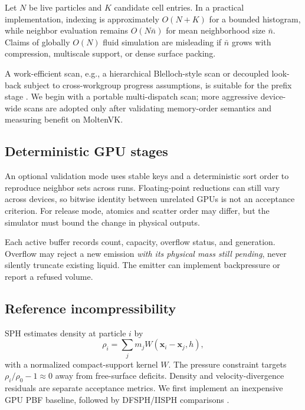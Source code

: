 \documentclass[10pt,a4paper]{article}
\makeatletter
\renewcommand{\section}{\@startsection{section}{1}{\z@}{1.35ex plus .5ex minus .1ex}{.7ex}{\normalfont\bfseries\normalsize}}
\makeatother
\begin{document}
Let $N$ be live particles and $K$ candidate cell entries. In a practical implementation, indexing is approximately $O(N+K)$ for a bounded histogram, while neighbor evaluation remains $O(N\bar n)$ for mean neighborhood size $\bar n$. Claims of globally $O(N)$ fluid simulation are misleading if $\bar n$ grows with compression, multiscale support, or dense surface packing.

A work-efficient scan, e.g., a hierarchical Blelloch-style scan or decoupled look-back subject to cross-workgroup progress assumptions, is suitable for the prefix stage \citep{merrill2016}. We begin with a portable multi-dispatch scan; more aggressive device-wide scans are adopted only after validating memory-order semantics and measuring benefit on MoltenVK.

\subsection{Deterministic GPU stages}
An optional validation mode uses stable keys and a deterministic sort order to reproduce neighbor sets across runs. Floating-point reductions can still vary across devices, so bitwise identity between unrelated GPUs is not an acceptance criterion. For release mode, atomics and scatter order may differ, but the simulator must bound the change in physical outputs.

Each active buffer records count, capacity, overflow status, and generation. Overflow may reject a new emission \emph{with its physical mass still pending}, never silently truncate existing liquid. The emitter can implement backpressure or report a refused volume.

\section{Numerical Solver}
\subsection{Reference incompressibility}
SPH estimates density at particle $i$ by
\begin{equation}
\rho_i=\sum_j m_j W(\mathbf x_i-\mathbf x_j,h),
\label{eq:density}
\end{equation}
with a normalized compact-support kernel $W$. The pressure constraint targets $\rho_i/\rho_0-1\approx 0$ away from free-surface deficits. Density and velocity-divergence residuals are separate acceptance metrics. We first implement an inexpensive GPU PBF baseline, followed by DFSPH/IISPH comparisons \citep{macklin2013,bender2015,ihmsen2014}.
\end{document}
